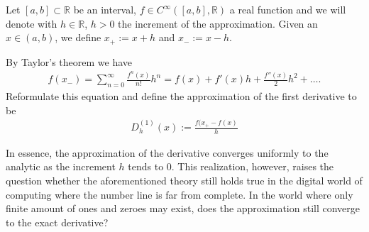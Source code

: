 Let \([a, b] \subset \mathbb{R}\) be an interval, \(f \in C^{\infty}([a, b], \mathbb{R})\) a real function and we will denote with \(h \in \mathbb{R}\), \(h > 0\) the increment of the approximation. Given an \(x \in (a, b)\), we define \(x_{+} := x + h\) and \(x_{-} := x - h\).

By Taylor's theorem we have
\begin{align*}
    f(x_{-}) = \sum^{\infty}_{n = 0} \frac{f^{n}(x)}{n!} h^n = f(x) + f'(x)h + \frac{f''(x)}{2}h^2 + \dots \text{.}
\end{align*}
Reformulate this equation and define the approximation of the first derivative to be
\begin{align*}
    D^{(1)}_h (x) := \frac{f(x_{+} - f(x)}{h}
\end{align*}

In essence, the approximation of the derivative converges uniformly to the analytic as the increment \(h\) tends to \(0\). This realization, however, raises the question whether the aforementioned theory still holds true in the digital world of computing where the number line is far from complete. In the world where only finite amount of ones and zeroes may exist, does the approximation still converge to the exact derivative?\\
